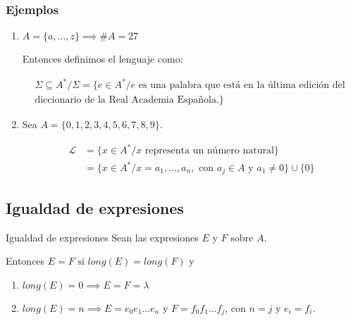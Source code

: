 \subsubsection{Ejemplos}

\begin{enumerate}
    \item $A = \{ a, \dotsc, z \} \implies \# A = 27$

        Entonces definimos el lenguaje como:
        
        \begin{gather*}
            \Sigma \subseteq A^{*} / \Sigma = \{ e \in A^{*} / e 
                \text{ es una palabra que está en la última edición del } \\ 
            \text{diccionario de la Real Academia Española.} \}
        \end{gather*}

    \item Sea $A = \{ 0, 1, 2, 3, 4, 5, 6, 7, 8, 9 \}$.

        \begin{align*}
            \mathcal{L} &= \{ x \in A^{*} / x 
            \text{ representa un número natural} \} \\
              &= \{ x \in A^{*} / x = a_1, \dotsc, a_n, \text{ con }
              a_j \in A \text{ y } a_1 \neq 0\} \cup \{ 0 \}
        \end{align*}
\end{enumerate}

\subsection{Igualdad de expresiones}


\begin{definicion}{Igualdad de expresiones}{}
    Sean las expresiones $E$ y $F$ sobre $A$.

    \medskip

    Entonces $E = F \text{ si } long(E) = long(F)$ y
    \begin{center}
    \begin{enumerate}[%
                    labelindent=*,
                    style=multiline,
                    leftmargin=*,
                    align=left,
                    leftmargin=2\parindent,
                    label=Caso \arabic*)]
        \item $long(E)= 0 \implies E = F = \lambda$
        \item $long(E) = n \implies E = e_0 e_1 \dots e_{n}$ y
            $F = f_0 f_1 \dots f_j$, con $n = j$ y $e_i = f_i$.
    \end{enumerate}
    \end{center}
\end{definicion}

